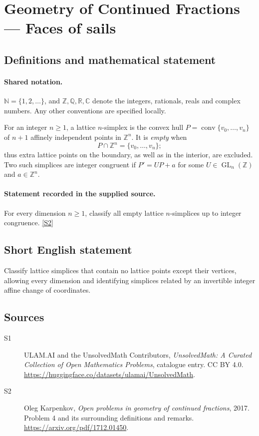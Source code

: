 \documentclass[11pt]{book}
\newcommand{\sref}[2]{\hyperlink{source:#1:#2}{[S#2]}}
\begin{document}
\section{Geometry of Continued Fractions — Faces of sails}\label{statement}

\subsection{Definitions and mathematical statement}

\paragraph{Shared notation.}$\mathbb N=\{1,2,\ldots\}$, and $\mathbb Z,\mathbb Q,\mathbb R,\mathbb C$ denote the integers, rationals, reals and complex numbers. Any other conventions are specified locally.


For an integer $n\ge1$, a lattice $n$-simplex is the convex hull $P=\operatorname{conv}\{v_0,\ldots,v_n\}$ of $n+1$ affinely independent points in $\mathbb Z^n$. It is \emph{empty} when
\[P\cap\mathbb Z^n=\{v_0,\ldots,v_n\};\]
thus extra lattice points on the boundary, as well as in the interior, are excluded. Two such simplices are integer congruent if $P'=UP+a$ for some $U\in\operatorname{GL}_n(\mathbb Z)$ and $a\in\mathbb Z^n$.
\paragraph{Statement recorded in the supplied source.}
For every dimension $n\ge1$, classify all empty lattice $n$-simplices up to integer congruence. \sref{statement}{2}
\subsection{Short English statement}
Classify lattice simplices that contain no lattice points except their vertices, allowing every dimension and identifying simplices related by an invertible integer affine change of coordinates.
\subsection{Sources}
\begin{description}
\item[\hypertarget{source:statement:1}{S1}] ULAM.AI and the UnsolvedMath Contributors, \emph{UnsolvedMath: A Curated Collection of Open Mathematics Problems}, catalogue entry. CC BY 4.0. \url{https://huggingface.co/datasets/ulamai/UnsolvedMath}.
\item[\hypertarget{source:statement:2}{S2}] Oleg Karpenkov, \emph{Open problems in geometry of continued fractions}, 2017. Problem 4 and its surrounding definitions and remarks. \url{https://arxiv.org/pdf/1712.01450}.
\end{description}
\label{end:statement}
\end{document}
